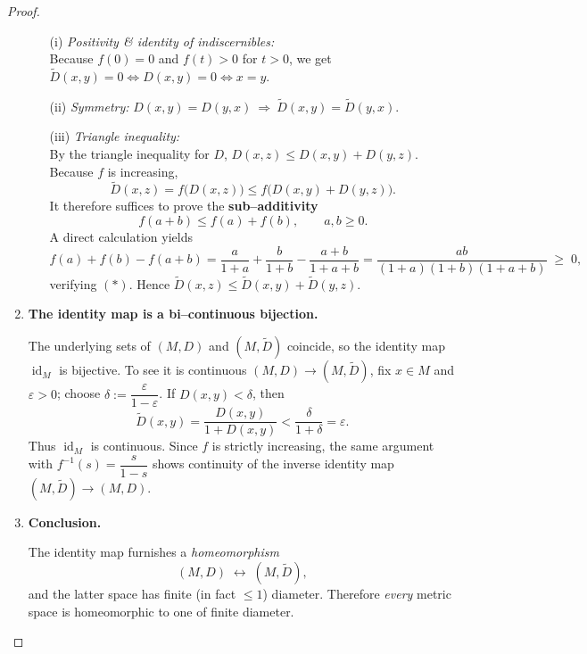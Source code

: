 \documentclass[12pt]{article}
\theoremstyle{definition} %
\theoremstyle{plain} %
\begin{document}
\begin{proof}
\begin{enumerate}
            \begin{enumerate}
                \item[(i)] \emph{Positivity \& identity of indiscernibles:}\\
                      Because $f(0)=0$ and $f(t)>0$ for $t>0$, we get
                      $\widetilde D(x,y)=0\iff D(x,y)=0\iff x=y$.
                \item[(ii)] \emph{Symmetry:}  
                      $D(x,y)=D(y,x)\ \Rightarrow\ 
                      \widetilde D(x,y)=\widetilde D(y,x)$.
                \item[(iii)] \emph{Triangle inequality:}\\
                      By the triangle inequality for $D$,
                      $D(x,z)\le D(x,y)+D(y,z)$.
                      Because $f$ is increasing,
                      \[
                          \widetilde D(x,z)=f\!\bigl(D(x,z)\bigr)
                          \le f\!\bigl(D(x,y)+D(y,z)\bigr).
                      \]
                      It therefore suffices to prove the \textbf{sub–additivity}
                      \[
                          f(a+b)\le f(a)+f(b),
                          \qquad a,b\ge0. \tag{$\ast$}
                      \]
                      A direct calculation yields
                      \[
                          f(a)+f(b)-f(a+b)
                          =\frac{a}{1+a}+\frac{b}{1+b}-\frac{a+b}{1+a+b}
                          =\frac{ab}{(1+a)(1+b)(1+a+b)}\;\ge\;0,
                      \]
                      verifying $(\ast)$.  Hence
                      $\widetilde D(x,z)\le
                      \widetilde D(x,y)+\widetilde D(y,z)$.
            \end{enumerate}

      \item \textbf{The identity map is a bi–continuous bijection.}

            The underlying sets of $(M,D)$ and $(M,\widetilde D)$ coincide, so
            the identity map $\operatorname{id}_M$ is bijective.
            To see it is continuous $(M,D)\to(M,\widetilde D)$, fix $x\in M$
            and $\varepsilon>0$; choose $\delta:=\dfrac{\varepsilon}{1-\varepsilon}$.
            If $D(x,y)<\delta$, then
            \[
                \widetilde D(x,y)
                =\frac{D(x,y)}{1+D(x,y)}
                <\frac{\delta}{1+\delta}=\varepsilon.
            \]
            Thus $\operatorname{id}_M$ is continuous.
            Since $f$ is strictly increasing, the same argument with
            $f^{-1}(s)=\dfrac{s}{1-s}$ shows continuity of the inverse
            identity map $(M,\widetilde D)\to(M,D)$.

      \item \textbf{Conclusion.}

            The identity map furnishes a \emph{homeomorphism}
            \[
                (M,D)\;\longleftrightarrow\;(M,\widetilde D),
            \]
            and the latter space has finite (in fact $\le1$) diameter.
            Therefore \emph{every} metric space is homeomorphic to one of
            finite diameter.
  \end{enumerate}
\end{proof}
\end{document}
